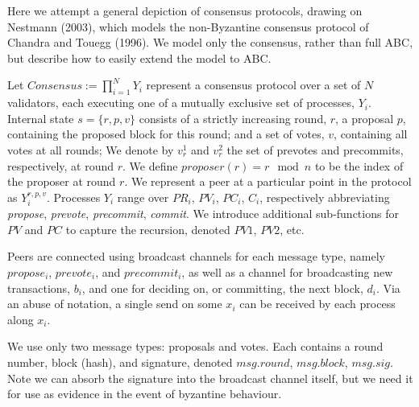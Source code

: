 \documentclass[12pt]{report}
\renewcommand{\|}{\;|\;}
\begin{document}
Here we attempt a general depiction of consensus protocols, drawing on Nestmann (2003),
which models the non-Byzantine consensus protocol of Chandra and Touegg (1996).
We model only the consensus, rather than full ABC, but describe how to 
easily extend the model to ABC.

Let $Consensus := \prod_{i=1}^N Y_i $ represent a consensus protocol
over a set of $N$ validators, each executing one of a mutually exclusive set of processes, $Y_i$.
Internal state $s = \{r, p, v \}$ consists of a strictly increasing round, $r$,
a proposal $p$, containing the proposed block for this round;
and a set of votes, $v$, containing all votes at all rounds;
We denote by $v_r^1$ and $v_r^2$ the set of prevotes and precommits, respectively, at round $r$.
We define $proposer(r) = r \mod n$ to be the index of the proposer at round $r$.
We represent a peer at a particular point in the protocol as $Y_i^{r, p, v}$.
Processes $Y_i$ range over $PR_i$, $PV_i$, $PC_i$, $C_i$,
respectively abbreviating 
\emph{propose}, \emph{prevote}, \emph{precommit}, \emph{commit}.
We introduce additional sub-functions for $PV$ and $PC$ to capture the recursion,
denoted $PV1$, $PV2$, etc.

Peers are connected using broadcast channels for each message type,
namely $propose_i$, $prevote_i$, and $precommit_i$,
as well as a channel for broadcasting new transactions, $b_i$,
and one for deciding on, or committing, the next block, $d_i$.
Via an abuse of notation, a single send on some $x_i$ can be received by each process along
$x_i$.

We use only two message types: proposals and votes. 
Each contains a round number, block (hash), and signature, 
denoted $msg.round$, $msg.block$, $msg.sig$.
Note we can absorb the signature into the broadcast channel itself,
but we need it for use as evidence in the event of byzantine behaviour.
\end{document}
